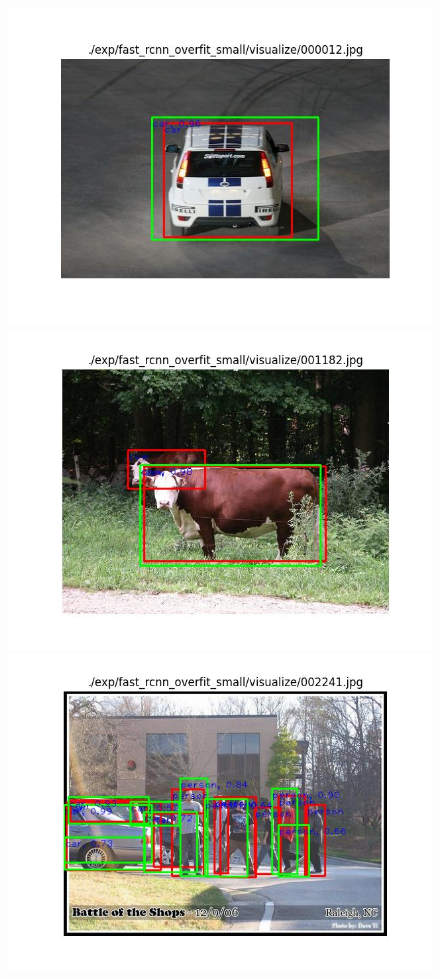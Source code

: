 \documentclass{article}%
\begin{document}
\begin{figure}[H]
    \centering
	\begin{minipage}{0.32\linewidth}
		\centering
		\includegraphics[width=0.9\linewidth]{fast_rcnn_overfit_small/visualize/000012.jpg}
	\end{minipage}
	\begin{minipage}{0.32\linewidth}
		\centering
		\includegraphics[width=0.9\linewidth]{fast_rcnn_overfit_small/visualize/001182.jpg}
	\end{minipage}
    \begin{minipage}{0.32\linewidth}
		\centering
		\includegraphics[width=0.9\linewidth]{fast_rcnn_overfit_small/visualize/002241.jpg}
	\end{minipage}
\end{figure}
\end{document}
